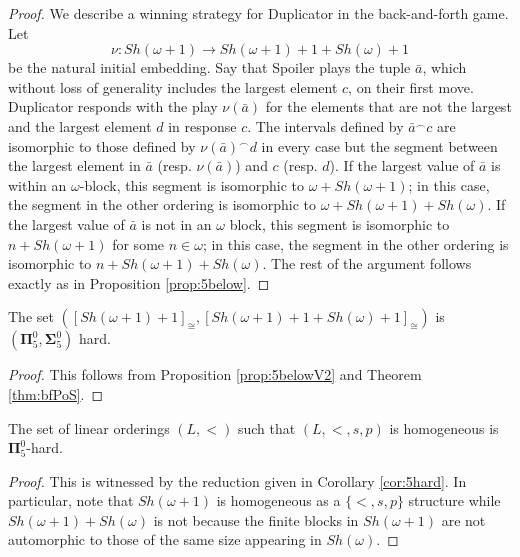 \documentclass[11pt]{amsart}
\theoremstyle{definition}
\begin{document}
\begin{proof}
We describe a winning strategy for Duplicator in the back-and-forth game.
Let 
\[\nu: Sh(\omega+1)\to Sh(\omega+1)+1+Sh(\omega)+1\]
be the natural initial embedding.
Say that Spoiler plays the tuple $\bar{a}$, which without loss of generality includes the largest element $c$, on their first move.
Duplicator responds with the play $\nu(\bar{a})$ for the elements that are not the largest and the largest element $d$ in response $c$.
The intervals defined by $\bar{a}^\frown c$ are isomorphic to those defined by $\nu(\bar{a})^\frown d$ in every case but the segment between the largest element in $\bar{a}$ (resp. $\nu(\bar{a})$) and $c$ (resp. $d$).
If the largest value of $\bar{a}$ is within an $\omega$-block, this segment is isomorphic to $\omega+Sh(\omega+1)$; in this case, the segment in the other ordering is isomorphic to $\omega+Sh(\omega+1)+Sh(\omega)$.
If the largest value of $\bar{a}$ is not in an $\omega$ block, this segment is isomorphic to $n+Sh(\omega+1)$ for some $n\in\omega$; in this case, the segment in the other ordering is isomorphic to $n+Sh(\omega+1)+Sh(\omega)$.
The rest of the argument follows exactly as in Proposition \ref{prop:5below}.

\end{proof}


\begin{corollary}\label{cor:5hardV2}
The set $([Sh(\omega+1)+1]_\cong,[Sh(\omega+1)+1+Sh(\omega)+1]_\cong)$ is $(\mathbf{\Pi}_5^0,\mathbf{\Sigma}_5^0)$ hard.
\end{corollary}

\begin{proof}
This follows from Proposition \ref{prop:5belowV2} and Theorem \ref{thm:bfPoS}.
\end{proof}



\begin{theorem}
The set of linear orderings $(L,<)$ such that $(L,<,s,p)$ is homogeneous is $\mathbf{\Pi}^0_5$-hard.
\end{theorem}

\begin{proof}
This is witnessed by the reduction given in Corollary \ref{cor:5hard}.
In particular, note that $Sh(\omega+1)$ is homogeneous as a $\{<,s,p\}$ structure while $Sh(\omega+1)+Sh(\omega)$ is not because the finite blocks in $Sh(\omega+1)$ are not automorphic to those of the same size appearing in $Sh(\omega)$.
\end{proof}
\end{document}
